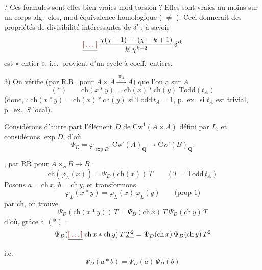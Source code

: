 \documentclass[11pt,a4paper]{article}
\begin{document}

? Ces formules sont-elles bien vraies mod torsion ? Elles sont vraies au moins
sur un corps alg.\ clos, mod équivalence homologique (
$\neq$ ). Ceci donnerait des propriétés de divisibilité
intéressantes de $\delta'$ : à savoir
\[
  \struck{\ill{}}\; \frac{\chi(\chi-1)\cdots(\chi-k+1)}{k!\,\chi^{k-2}}\, \delta'^{k}
\]
est « entier », i.e.\ provient d'un cycle à coeff.\ entiers.



3) On vérifie (par R.R.\ pour $A \times A \xrightarrow{\;\pi_A\;} A$) que
l'on a sur $A$
\[
  (*) \qquad \mathrm{ch}(x * y) = \mathrm{ch}(x) * \mathrm{ch}(y)\; \mathrm{Todd}(t_A)
\]
(donc, \ill{} : $\mathrm{ch}(x * y) = \mathrm{ch}(x) * \mathrm{ch}(y)$ si
$\mathrm{Todd}\, t_A = 1$, p.\ ex.\ si $t_A$ est trivial, p.\ ex.\ $S$
local).

Considérons d'autre part l'élément $D$ de $\mathrm{Cw}^{1}(A \times A)$
défini par $L$, et considérons  $\exp D$, d'où
\[
  \Psi_D = \varphi_{\exp D} \colon \mathrm{Cw}^{\cdot}(A)_{\mathbf{Q}} \longrightarrow \mathrm{Cw}^{\cdot}(B)_{\mathbf{Q}}.
\]




 \ill{}, par RR pour $A \times_S B \to B$ :
\[
  \mathrm{ch}(\varphi_L(x)) = \Psi_D(\mathrm{ch}(x))\, T \qquad (T = \mathrm{Todd}\, t_A)
\]
 Posons $a = \mathrm{ch}\, x$, $b = \mathrm{ch}\, y$,
et transformons \ill{}
\[
  \varphi_L(x * y) = \varphi_L(x)\, \varphi_L(y) \qquad \text{(prop 1)}
\]
par $\mathrm{ch}$, on trouve
\[
  \Psi_D(\mathrm{ch}(x * y))\, T = \Psi_D(\mathrm{ch}\, x)\, T\; \Psi_D(\mathrm{ch}\, y)\, T
\]
d'où, \struck{\ill{}} grâce à $(*)$ :
\[
  \Psi_D(\struck{\ill{}}\; \mathrm{ch}\, x * \mathrm{ch}\, y)\, T\, \struck{T^{2}}
  = \Psi_D(\mathrm{ch}\, x)\, \Psi_D(\mathrm{ch}\, y)\, T^{2}
\]
i.e.
\[
  \Psi_D(a * b) = \Psi_D(a)\, \Psi_D(b)
\]
\end{document}
